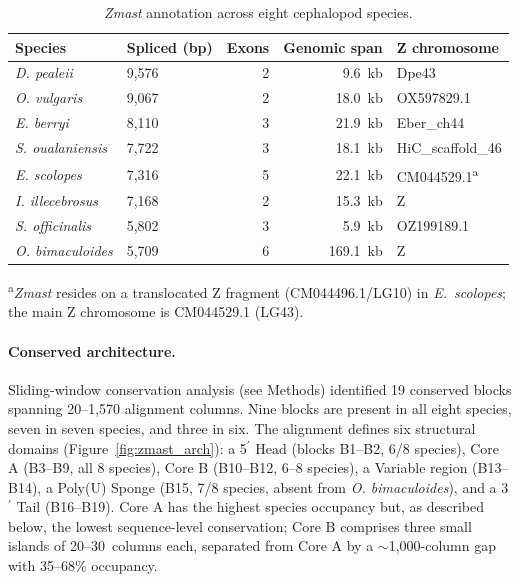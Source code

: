 \documentclass[12pt]{article}
\begin{document}
\begin{table}[tbp]
\centering
\small
\caption{\textit{Zmast} annotation across eight cephalopod species.}
\label{tab:zmast_annotation}
\begin{tabular}{llrrl}
\hline
Species & Spliced (bp) & Exons & Genomic span & Z chromosome \\
\hline
\textit{D. pealeii} & 9,576 & 2 & 9.6~kb & Dpe43 \\
\textit{O. vulgaris} & 9,067 & 2 & 18.0~kb & OX597829.1 \\
\textit{E. berryi} & 8,110 & 3 & 21.9~kb & Eber\_ch44 \\
\textit{S. oualaniensis} & 7,722 & 3 & 18.1~kb & HiC\_scaffold\_46 \\
\textit{E. scolopes} & 7,316 & 5 & 22.1~kb & CM044529.1\textsuperscript{a} \\
\textit{I. illecebrosus} & 7,168 & 2 & 15.3~kb & Z \\
\textit{S. officinalis} & 5,802 & 3 & 5.9~kb & OZ199189.1 \\
\textit{O. bimaculoides} & 5,709 & 6 & 169.1~kb & Z \\
\hline
\end{tabular}

\smallskip
\noindent\textsuperscript{a}\textit{Zmast} resides on a translocated Z fragment (CM044496.1/LG10) in \textit{E.\ scolopes}; the main Z chromosome is CM044529.1 (LG43).
\end{table}

\paragraph{Conserved architecture.}
Sliding-window conservation analysis (see Methods)
identified 19 conserved blocks spanning 20--1,570 alignment columns.
Nine blocks are present in all eight species,
seven in seven species, and three in six.
The alignment defines six structural domains
(Figure~\ref{fig:zmast_arch}):
a 5$^\prime$ Head (blocks B1--B2, 6/8 species),
Core A (B3--B9, all 8 species),
Core B (B10--B12, 6--8 species),
a Variable region (B13--B14),
a Poly(U) Sponge (B15, 7/8 species, absent from \textit{O. bimaculoides}),
and a 3$^\prime$ Tail (B16--B19).
Core A has the highest species occupancy
but, as described below, the lowest sequence-level conservation;
Core B comprises three small islands of 20--30~columns each,
separated from Core A by a $\sim$1,000-column gap
with 35--68\% occupancy.
\end{document}
